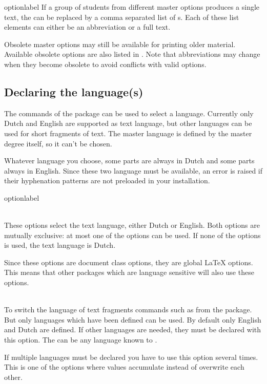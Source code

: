 \begin{labelled}{optionlabel}
  If a group of students from different master options produces a single
  text, the  can be replaced by a comma separated list of
  s. Each of these list elements can either be an abbreviation or
  a full text. 

  Obsolete master options may still be available for printing older
  material. Available obsolete options are also listed in
  . Note that abbreviations may change when they become
  obsolete to avoid conflicts with valid options.
\end{labelled}

\subsection{Declaring the language(s)}
The commands of the  package can be used to select a language.
Currently only Dutch and English are supported as text language, but other
languages can be used for short fragments of text. The master language is
defined by the master degree itself, so it can't be chosen.

Whatever language you choose, some parts are always in Dutch and some parts
always in English. Since these two language must be available, an error is
raised if their hyphenation patterns are not preloaded in your installation.

\begin{labelled}{optionlabel}
\item[dutch \and english]\\
  These options select the text language, either Dutch or English.
  Both options are mutually exclusive: at most one of the options can be used.
  If none of the options is used, the text language is Dutch.

  Since these options are document class options, they are global LaTeX
  options. This means that other packages which are language sensitive will
  also use these options.

\item[extralanguage=\meta{lang}]\\
  To switch the language of text fragments commands such as
   from the  package. But only languages
  which have been defined can be used. By default only English and Dutch
  are defined. If other languages are needed, they must be declared with
  this  option. The  can be any language
  known to .

  If multiple languages must be declared you have to use this option
  several times. This is one of the options where values accumulate instead
  of overwrite each other.
\end{labelled}

